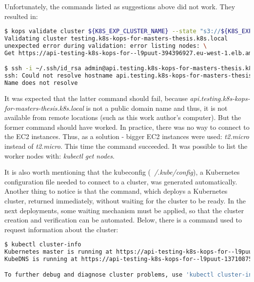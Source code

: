 Unfortunately, the commands listed as suggestions above did not work. They resulted in:
\begin{lstlisting}[basicstyle=\tiny,caption={Commands run in attempt to connect with a cluster created by Kops together with returned output},captionpos=b,language=Bash,xleftmargin=1cm]
$ kops validate cluster ${K8S_EXP_CLUSTER_NAME} --state "s3://${K8S_EXP_KOPS_S3_BUCKET}"
Validating cluster testing.k8s-kops-for-masters-thesis.k8s.local
unexpected error during validation: error listing nodes: \
Get https://api-testing-k8s-kops-for--l9puut-394396927.eu-west-1.elb.amazonaws.com/api/v1/nodes: EOF

$ ssh -i ~/.ssh/id_rsa admin@api.testing.k8s-kops-for-masters-thesis.k8s.local
ssh: Could not resolve hostname api.testing.k8s-kops-for-masters-thesis.k8s.local: \
Name does not resolve
\end{lstlisting}

It was expected that the latter command should fail, because \textit{api.testing.k8s-kops-for-masters-thesis.k8s.local} is not a public domain name and thus, it is not available from remote locations (such as this work author's computer). But the former command should have worked. In practice, there was no way to connect to the EC2 instances. Thus, as a solution - bigger EC2 instances were used: \textit{t2.micro} instead of \textit{t2.micro}. This time the command succeeded. It was possible to list the worker nodes with: \textit{kubectl get nodes}.

It is also worth mentioning that the kubeconfig (\textit{~/.kube/config}), a Kubernetes configuration file needed to connect to a cluster, was generated automatically. Another thing to notice is that the command, which deploys a Kubernetes cluster, returned immediately, without waiting for the cluster to be ready. In the next deployments, some waiting mechanism must be applied, so that the cluster creation and verification can be automated. Below, there is a command used to request information about the cluster:
\begin{lstlisting}[basicstyle=\tiny,caption={Command used to request information about a running Kubernetes cluster},captionpos=b,language=Bash,xleftmargin=1cm]
$ kubectl cluster-info
Kubernetes master is running at https://api-testing-k8s-kops-for--l9puut-1371087518.eu-west-1.elb.amazonaws.com
KubeDNS is running at https://api-testing-k8s-kops-for--l9puut-1371087518.eu-west-1.elb.amazonaws.com/api/v1/namespaces/kube-system/services/kube-dns:dns/proxy

To further debug and diagnose cluster problems, use 'kubectl cluster-info dump'.
\end{lstlisting}


